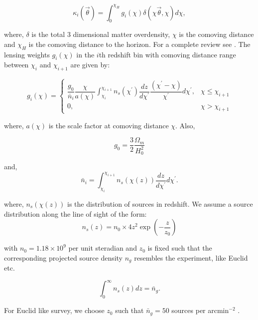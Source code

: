 \documentclass[
  11pt,
  twoside,
  openright,
  titlepage,
  headings=optiontoheadandtoc
]{scrbook}
\begin{document}
\begin{equation}
	\kappa_i(\vec{\theta}) =  \int_0^{\chi_H} g_i(\chi) \delta(\chi \vec{\theta},\chi)d\chi,
\end{equation}

where, $\delta$ is the total 3 dimensional matter overdensity, $\chi$ is the comoving distance and $\chi_H$ is the comoving distance to the horizon. For a complete review see \cite{1999ARA&A..37..127M, 2001PhR...340..291B, 2006glsw.conf..269S}. The lensing weights $g_i(\chi)$ in the $i$th redshift bin with comoving distance range between $\chi_i$ and $\chi_{i+1}$ are given by:

\begin{equation}
g_i(\chi) = \begin{cases} \dfrac{g_0}{\bar{n}_i} \dfrac{\chi}{a(\chi)} \int_{\chi_i}^{\chi_{i+1}} n_s(\chi^{\prime})\dfrac{dz}{d\chi^{\prime}} \dfrac{(\chi^{\prime} - \chi) }{\chi^{\prime}} d\chi^{\prime}, & \chi \le \chi_{i+1} \\
			0, & \chi > \chi_{i+1} \end{cases}
\end{equation}

where, $a(\chi)$ is the scale factor at comoving distance $\chi$. Also, 

\begin{equation}
	g_0 = \dfrac{3}{2} \dfrac{\Omega_m}{H_0^2}
\end{equation}

and,
\begin{equation}
	\bar{n}_i = \int_{\chi_i}^{\chi_{i+1}} n_s(\chi(z)) \dfrac{dz}{d\chi^{\prime}} d\chi^{\prime}.
\end{equation}

where, $n_s(\chi(z))$ is the distribution of sources in redshift. We assume a source distribution along the line of sight of the form:
\begin{equation}
	n_s(z) = n_0 \times 4z^2 \exp\left(-\dfrac{z}{z_0}   \right)
\end{equation}

with $n_0 = 1.18 \times 10^{9} $ per unit steradian and $z_0$ is fixed such that the corresponding projected source density $n_g$ resembles the experiment, like Euclid etc.

\begin{equation}
	\int_0^{\infty} n_s(z)dz = \bar{n}_g.
\end{equation}

For Euclid like survey, we choose $z_0$ such that $\bar{n}_g=50$ sources per arcmin$^{-2}$ \citep{2008ARNPS..58...99H}.
\end{document}
